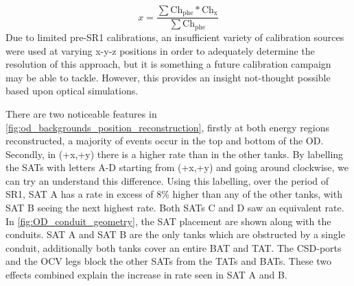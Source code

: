 \begin{equation}
    x = \frac{\sum{\text{Ch}_{\text{phe}} * \text{Ch}_\text{x}}}{\sum{\text{Ch}_\text{phe}}} 
\label{eq:OD_xy_position}
\end{equation}
Due to limited pre-SR1 calibrations, an insufficient variety of calibration sources were used at varying x-y-z positions in order to adequately determine the resolution of this approach, but it is something a future calibration campaign may be able to tackle. 
However, this provides an insight not-thought possible based upon optical simulations.




\par
There are two noticeable features in \autoref{fig:od_backgrounds_position_reconstruction}, firstly at both energy regions reconstructed, a majority of events occur in the top and bottom of the OD. 
Secondly, in (+x,+y) there is a higher rate than in the other tanks.
By labelling the SATs with letters A-D starting from (+x,+y) and going around clockwise, we can try an understand this difference.
Using this labelling, over the period of SR1, SAT A has a rate in excess of 8\% higher than any of the other tanks, with SAT B seeing the next highest rate.
Both SATs C and D saw an equivalent rate.
In \autoref{fig:OD_conduit_geometry}, the SAT placement are shown along with the conduits.
SAT A and SAT B are the only tanks which are obstructed by a single conduit, additionally both tanks cover an entire BAT and TAT. 
The CSD-ports and the OCV legs block the other SATs from the TATs and BATs.
These two effects combined explain the increase in rate seen in SAT A and B.


